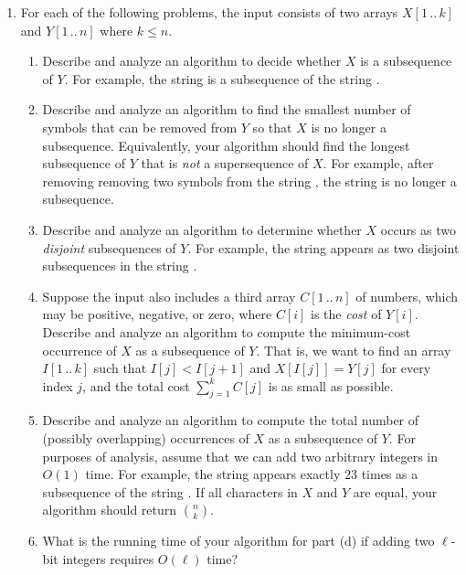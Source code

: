 \begin{enumerate}[label=\arabic*.,ref=\thechapter.\arabic*,leftmargin=*,align=left,widest*=99,itemsep=1.5ex plus 0.5ex]
\item For each of the following problems, the input consists of two arrays $X[1\,..\,k]$ and $Y[1\,..\,n]$ where $k \le n$.
\begin{enumerate}
\item Describe and analyze an algorithm to decide whether $X$ is a subsequence of $Y$.
For example, the string  is a subsequence of the string .
\item Describe and analyze an algorithm to find the smallest number of symbols that can be removed from $Y$ so that $X$ is no longer a subsequence.
Equivalently, your algorithm should find the longest subsequence of $Y$ that is \textit{not} a supersequence of $X$.
For example, after removing removing two symbols from the string , the string  is no longer a subsequence.
\item {} Describe and analyze an algorithm to determine whether $X$ occurs as two \textit{disjoint} subsequences of $Y$.
For example, the string  appears as two disjoint subsequences in the string .
\item Suppose the input also includes a third array $C[1\,..\,n]$ of numbers, which may be positive, negative, or zero, where $C[i]$ is the \textit{cost} of $Y[i]$.
Describe and analyze an algorithm to compute the minimum-cost occurrence of $X$ as a subsequence of $Y$.
That is, we want to find an array $I[1\,..\,k]$ such that $I[j] < I[j+1]$ and $X[I[j]] = Y[j]$ for every index $j$, and the total cost $\sum_{j=1}^{k} C[j]$ is as small as possible.
\item Describe and analyze an algorithm to compute the total number of (possibly overlapping) occurrences of $X$ as a subsequence of $Y$.
For purposes of analysis, assume that we can add two arbitrary integers in $O(1)$ time.
For example, the string  appears exactly 23 times as a subsequence of the string .
If all characters in $X$ and $Y$ are equal, your algorithm should return $\binom{n}{k}$.
\item What is the running time of your algorithm for part (d) if adding two $\ell$-bit integers requires $O(\ell)$ time?
\end{enumerate}


\end{enumerate}
